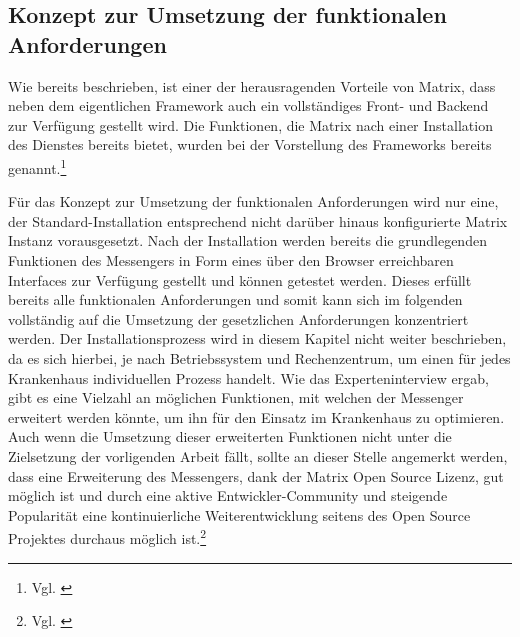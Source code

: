 \subsection{Konzept zur Umsetzung der funktionalen Anforderungen}\label{chapter:am}
Wie bereits beschrieben, ist einer der herausragenden Vorteile von Matrix, dass neben dem eigentlichen Framework auch ein vollständiges Front- und Backend zur Verfügung gestellt wird. Die Funktionen, die Matrix nach einer Installation des Dienstes bereits bietet, wurden bei der Vorstellung des Frameworks bereits genannt.\footnote{Vgl. \cite{Github2020}}

Für das Konzept zur Umsetzung der funktionalen Anforderungen wird nur eine, der Standard-Installation entsprechend nicht darüber hinaus konfigurierte Matrix Instanz vorausgesetzt. Nach der Installation werden bereits die grundlegenden Funktionen des Messengers in Form eines über den Browser erreichbaren Interfaces zur Verfügung gestellt und können getestet werden. Dieses erfüllt bereits alle funktionalen Anforderungen und somit kann sich im folgenden vollständig auf die Umsetzung der gesetzlichen Anforderungen konzentriert werden.
Der Installationsprozess wird in diesem Kapitel nicht weiter beschrieben, da es sich hierbei, je nach Betriebssystem und Rechenzentrum, um einen für jedes Krankenhaus individuellen Prozess handelt.
Wie das Experteninterview ergab, gibt es eine Vielzahl an möglichen Funktionen, mit welchen der Messenger erweitert werden könnte, um ihn für den Einsatz im Krankenhaus zu optimieren. Auch wenn die Umsetzung dieser erweiterten Funktionen nicht unter die Zielsetzung der vorligenden Arbeit fällt, sollte an dieser Stelle angemerkt werden, dass eine Erweiterung des Messengers, dank der Matrix Open Source Lizenz, gut möglich ist und durch eine aktive Entwickler-Community und steigende Popularität eine kontinuierliche Weiterentwicklung seitens des Open Source Projektes durchaus möglich ist.\footnote{Vgl. \cite{Github2020}}

